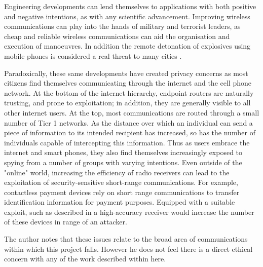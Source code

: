Engineering developments can lend themselves to applications with both
positive and negative intentions, as with any scientific advancement.
Improving wireless communications can play into the hands of military
and terrorist leaders, as cheap and reliable wireless communications can
aid the organisation and execution of manoeuvres. In addition the remote
detonation of explosives using mobile phones is considered a real threat
to many cities \cite{[10]}.

Paradoxically, these same developments have created privacy concerns as most citizens find themselves communicating through the internet and the cell phone network. At the bottom of the internet hierarchy, endpoint routers are naturally trusting, and prone to exploitation; in addition, they are generally visible to all other internet users. At the top, most communications are routed through a small number of Tier 1 networks. As the distance over which an individual can send a piece of information to its intended recipient has increased, so has the number of individuals capable of intercepting this information. Thus as users embrace the internet and smart phones, they also find themselves increasingly exposed to spying from a number of groups with varying intentions. Even outside of the "online" world, increasing the efficiency of radio receivers can lead to the exploitation of security-sensitive short-range communications. For example, contactless payment devices rely on short range communications to transfer identification information for payment purposes. Equipped with a suitable exploit, such as described in \cite{[9]} a high-accuracy receiver would increase the number of these devices in range of an attacker.

The author notes that these issues relate to the broad area of communications within which this project falls. However he does not feel there is a direct ethical concern with any of the work described within here.
